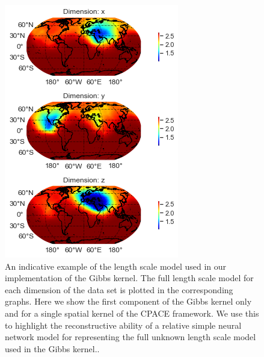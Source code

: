 \begin{figure}
	\centering
	\includegraphics[width=\textwidth]{gibbs_lengthscale}
	\caption[An indicative example of the length scale model used in our implementation of the Gibbs kernel.]{An indicative example of the length scale model used in our implementation of the Gibbs kernel. The full length scale model for each dimension of the data set is plotted in the corresponding graphs. Here we show the first component of the Gibbs kernel only and for a single spatial kernel of the CPACE framework. We use this to highlight the reconstructive ability of a relative simple neural network model for representing the full unknown length scale model used in the Gibbs kernel..}
	\label{fig:gibbs_lengthscale}
\end{figure}